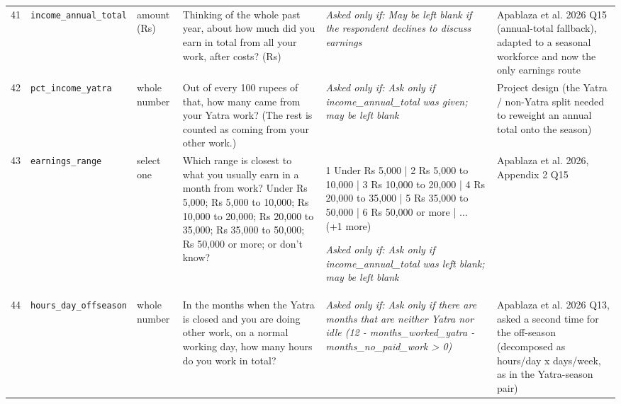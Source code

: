 \documentclass[9pt,a4paper,landscape]{article}
\begin{document}
\begin{longtable}{@{}p{0.5cm}p{3.3cm}p{1.7cm}p{7.3cm}p{5.6cm}p{5.4cm}@{}}
\footnotesize 41 & \footnotesize\texttt{income\_annual\_total} & \scriptsize amount (Rs) & \footnotesize Thinking of the whole past year, about how much did you earn in total from all your work, after costs? (Rs)\par\vspace{1pt}{\footnotesize\color{hdr}{\hifont पूरे पिछले साल को मिलाकर, सारे काम से ख़र्चा निकालकर आपने कुल कितना कमाया? (रुपये)}} & \scriptsize \textit{Asked only if: May be left blank if the respondent declines to discuss earnings} & \scriptsize Apablaza et al. 2026 Q15 (annual-total fallback), adapted to a seasonal workforce and now the only earnings route\\
\footnotesize 42 & \footnotesize\texttt{pct\_income\_yatra} & \scriptsize whole number & \footnotesize Out of every 100 rupees of that, how many came from your Yatra work? (The rest is counted as coming from your other work.)\par\vspace{1pt}{\footnotesize\color{hdr}{\hifont पूरे साल में आपने जो 100 रुपये कमाए, उनमें से कितने यात्रा के काम से आए? (बाकी दूसरे काम का माना जाएगा।)}} & \scriptsize \textit{Asked only if: Ask only if income\_annual\_total was given; may be left blank} & \scriptsize Project design (the Yatra / non-Yatra split needed to reweight an annual total onto the season)\\
\footnotesize 43 & \footnotesize\texttt{earnings\_range} & \scriptsize select one & \footnotesize Which range is closest to what you usually earn in a month from work? Under Rs 5,000; Rs 5,000 to 10,000; Rs 10,000 to 20,000; Rs 20,000 to 35,000; Rs 35,000 to 50,000; Rs 50,000 or more; or don't know?\par\vspace{1pt}{\footnotesize\color{hdr}{\hifont आपकी एक महीने की कमाई लगभग किस दायरे में है? 5,000 रुपये से कम; 5,000 से 10,000; 10,000 से 20,000; 20,000 से 35,000; 35,000 से 50,000; 50,000 या उससे ज़्यादा; या पता नहीं?}} & \scriptsize 1 Under Rs 5,000 | 2 Rs 5,000 to 10,000 | 3 Rs 10,000 to 20,000 | 4 Rs 20,000 to 35,000 | 5 Rs 35,000 to 50,000 | 6 Rs 50,000 or more | ... (+1 more)\par\vspace{1pt}\textit{Asked only if: Ask only if income\_annual\_total was left blank; may be left blank} & \scriptsize Apablaza et al. 2026, Appendix 2 Q15\\
\footnotesize 44 & \footnotesize\texttt{hours\_day\_offseason} & \scriptsize whole number & \footnotesize In the months when the Yatra is closed and you are doing other work, on a normal working day, how many hours do you work in total?\par\vspace{1pt}{\footnotesize\color{hdr}{\hifont जिन महीनों में यात्रा बंद रहती है और आप कोई दूसरा काम करते हैं, उनमें आम दिन में आप कुल कितने घंटे काम करते हैं?}} & \scriptsize \textit{Asked only if: Ask only if there are months that are neither Yatra nor idle (12 - months\_worked\_yatra - months\_no\_paid\_work > 0)} & \scriptsize Apablaza et al. 2026 Q13, asked a second time for the off-season (decomposed as hours/day x days/week, as in the Yatra-season pair)\\

\end{longtable}
\end{document}
